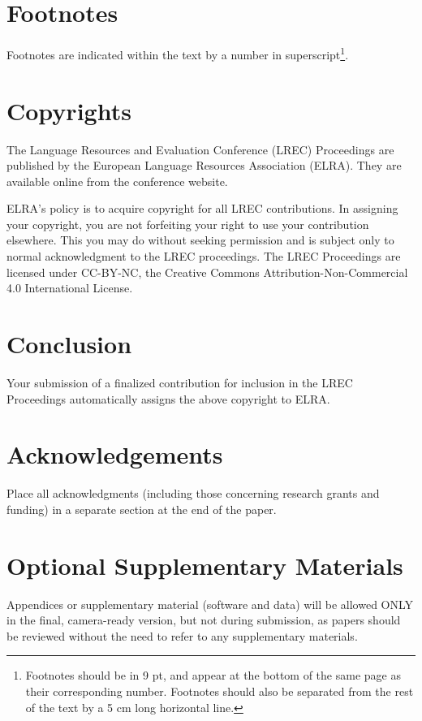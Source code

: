 \documentclass[10pt, a4paper]{article}
\begin{document}
\section{Footnotes}

Footnotes are indicated within the text by a number in superscript\footnote{Footnotes should be in  9 pt, and appear at the bottom of the same page as their corresponding number. Footnotes should also be separated from the rest of the text by a 5 cm long horizontal line.}.

\section{Copyrights}

The Language Resources and Evaluation Conference (LREC) Proceedings are published by the European Language Resources Association (ELRA). They are available online from the conference website.

ELRA's policy is to acquire copyright for all LREC contributions. In assigning your copyright, you are not forfeiting your right to use your contribution elsewhere. This you may do without seeking permission and is subject only to normal acknowledgment to the LREC proceedings. The LREC Proceedings are licensed under CC-BY-NC, the Creative Commons Attribution-Non-Commercial 4.0 International License.


\section{Conclusion}

Your submission of a finalized contribution for inclusion in the LREC Proceedings automatically assigns the above copyright to ELRA.

\section{Acknowledgements}

Place all acknowledgments (including those concerning research grants and funding) in a separate section at the end of the paper.

\section{Optional Supplementary Materials}

Appendices or supplementary material (software and data) will be allowed ONLY in the final, camera-ready version, but not during submission, as papers should be reviewed without the need to refer to any supplementary
materials.
\end{document}
